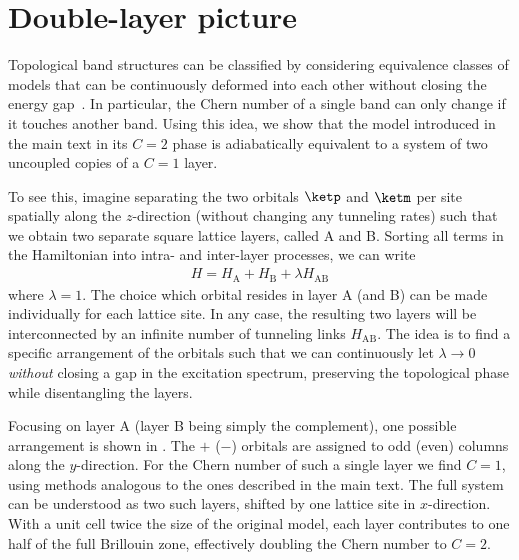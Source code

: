 \section{Double-layer picture}


Topological band structures can be classified by considering equivalence classes of models that can be continuously deformed into each other without closing the energy gap~\cite{Hasan2010}.
In particular, the Chern number of a single band can only change if it touches another band.
Using this idea, we show that the model introduced in the main text in its $C=2$ phase is adiabatically equivalent to a system of two uncoupled copies of a $C=1$ layer.

To see this, imagine separating the two orbitals $\ketp$ and $\ketm$ per site spatially along the $z$-direction (without changing any tunneling rates) such that we obtain two separate square lattice layers, called A and B.
Sorting all terms in the Hamiltonian into intra- and inter-layer processes, we can write
\begin{align}
H=H_\text{A} + H_\text{B} + \lambda H_\text{AB}
\end{align}
where $\lambda=1$.
The choice which orbital resides in layer A (and B) can be made individually for each lattice site.
In any case, the resulting two layers will be interconnected by an infinite number of tunneling links $H_\text{AB}$.
The idea is to find a specific arrangement of the orbitals such that we can continuously let $\lambda \longrightarrow 0$ \emph{without} closing a gap in the excitation spectrum, preserving the topological phase while disentangling the layers.

Focusing on layer A (layer B being simply the complement), one possible arrangement is shown in .
The ${+}$ (${-}$) orbitals are assigned to odd (even) columns along the $y$-direction.
For the Chern number of such a single layer we find $C=1$, using methods analogous to the ones described in the main text.
The full system can be understood as two such layers, shifted by one lattice site in $x$-direction.
With a unit cell twice the size of the original model, each layer contributes to one half of the full Brillouin zone, effectively doubling the Chern number to $C=2$.

